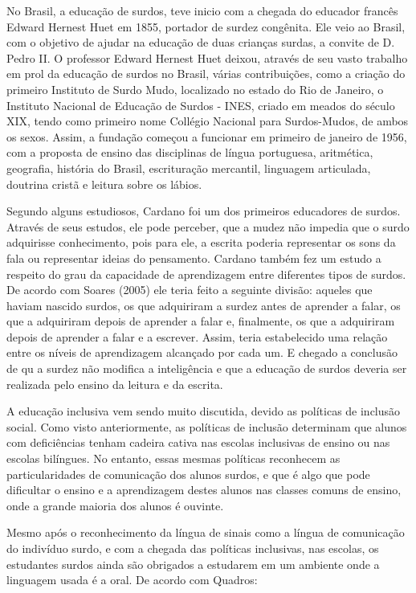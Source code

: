 \documentclass[brasil]{abnt}
\begin{document}
	No Brasil, a educação de surdos, teve inicio com a chegada do educador francês Edward Hernest Huet em 1855, portador de surdez congênita. Ele veio ao Brasil, com o objetivo de ajudar na educação de duas 
	crianças surdas, a convite de D. Pedro II. O professor Edward Hernest Huet deixou, através de seu vasto trabalho em prol da educação de surdos no Brasil, várias contribuições, como a criação do primeiro 
	Instituto de Surdo Mudo, localizado no estado do Rio de Janeiro, o Instituto Nacional de Educação de Surdos - INES, criado em meados do século 
	XIX, tendo como primeiro nome Collégio Nacional para Surdos-Mudos, de ambos os sexos. Assim, a fundação começou a funcionar em primeiro de janeiro de 1956, com a proposta de ensino das disciplinas de língua 
	portuguesa, aritmética, geografia, história do Brasil, escrituração mercantil, linguagem articulada, doutrina cristã e leitura sobre os lábios.    	
	
	Segundo alguns estudiosos, Cardano foi um dos primeiros educadores de surdos. Através de seus estudos, ele pode perceber, que a mudez não impedia que o surdo adquirisse conhecimento, pois para ele, a 
	escrita poderia representar os sons da fala ou representar ideias do pensamento. 
	Cardano também fez um estudo a respeito do grau da capacidade de 
	aprendizagem entre diferentes tipos de surdos. De acordo com Soares 
	(2005) ele teria feito a seguinte divisão: aqueles que haviam 
	nascido surdos, os que adquiriram a surdez antes de aprender a falar, os que a adquiriram depois de aprender a falar e, finalmente, os que a adquiriram depois de aprender a falar e a escrever. 
	Assim, teria estabelecido uma relação entre os níveis de 
	aprendizagem alcançado por cada um. E chegado a conclusão de qu a surdez não modifica a inteligência e que a educação de surdos deveria ser 
	realizada pelo ensino da leitura e da escrita.
	
	A educação inclusiva vem sendo muito discutida, devido as políticas de inclusão social. Como visto anteriormente, as políticas de inclusão determinam que alunos com deficiências tenham cadeira cativa 
	nas escolas inclusivas de ensino ou nas escolas bilíngues. No entanto, essas mesmas políticas reconhecem as particularidades de comunicação dos alunos surdos, e que é algo que pode dificultar o ensino e 
	a aprendizagem destes alunos nas classes comuns de ensino, onde a grande maioria dos alunos é ouvinte.
	
	Mesmo após o reconhecimento da língua de sinais como a língua de comunicação do 
	indivíduo surdo, e com a chegada das políticas inclusivas, nas escolas, os estudantes surdos ainda são obrigados a estudarem em um ambiente onde a linguagem usada é a oral. De acordo com Quadros:
					
\end{document}

